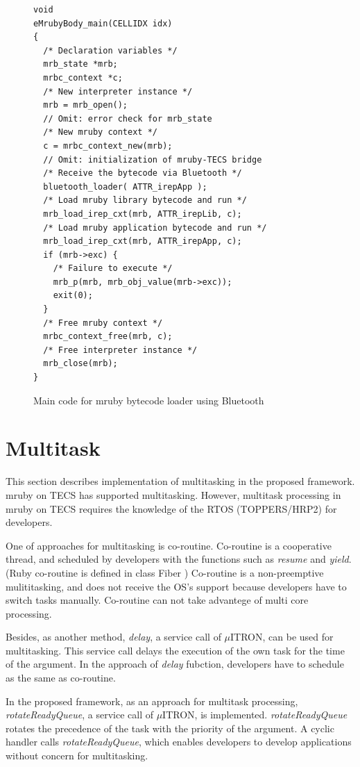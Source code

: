 \documentclass[conference,compsoc]{IEEEtran}
\begin{document}
\begin{figure}[t]
\centering
\begin{lstlisting}
void
eMrubyBody_main(CELLIDX idx)
{
  /* Declaration variables */
  mrb_state *mrb;
  mrbc_context *c;
  /* New interpreter instance */
  mrb = mrb_open();
  // Omit: error check for mrb_state
  /* New mruby context */
  c = mrbc_context_new(mrb);
  // Omit: initialization of mruby-TECS bridge
  /* Receive the bytecode via Bluetooth */
  bluetooth_loader( ATTR_irepApp );
  /* Load mruby library bytecode and run */
  mrb_load_irep_cxt(mrb, ATTR_irepLib, c);
  /* Load mruby application bytecode and run */
  mrb_load_irep_cxt(mrb, ATTR_irepApp, c);
  if (mrb->exc) {
    /* Failure to execute */
    mrb_p(mrb, mrb_obj_value(mrb->exc));
    exit(0);
  }
  /* Free mruby context */
  mrbc_context_free(mrb, c);
  /* Free interpreter instance */
  mrb_close(mrb);
}

\end{lstlisting}
\caption{Main code for mruby bytecode loader using Bluetooth}
\label{maincode_mrubybluetooth}
\end{figure}
\section{Multitask}
\label{sec:Multitask}
This section describes implementation of multitasking in the proposed framework.
mruby on TECS has supported multitasking.
However, multitask processing in mruby on TECS requires the knowledge of the RTOS (TOPPERS/HRP2) for developers.

One of approaches for multitasking is co-routine.
Co-routine is a cooperative thread, and scheduled by developers with the functions such as {\it resume} and {\it yield}. 
(Ruby co-routine is defined in class Fiber \cite{url:co-routine})
Co-routine is a non-preemptive mulititasking, and does not receive the OS's support because developers have to switch tasks manually.
Co-routine can not take advantege of multi core processing.

Besides, as another method, {\it delay}, a service call of $\mu$ITRON, can be used for multitasking.
This service call delays the execution of the own task for the time of the argument.
In the approach of {\it delay} fubction, developers have to schedule as the same as co-routine.

In the proposed framework, as an approach for multitask processing, {\it rotateReadyQueue}, a service call of $\mu$ITRON, is implemented.
{\it rotateReadyQueue} rotates the precedence of the task with the priority of the argument.
A cyclic handler calls {\it rotateReadyQueue}, which enables developers to develop applications without concern for multitasking.
\end{document}
